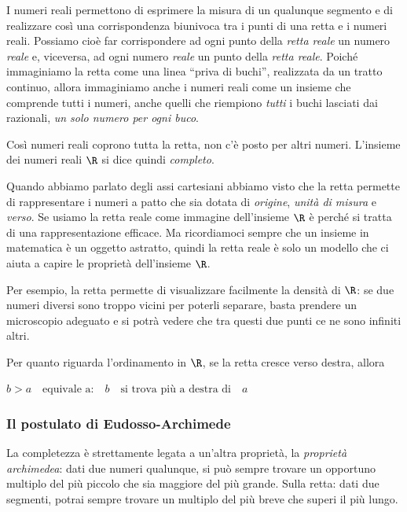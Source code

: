 
I numeri reali 
permettono di esprimere la misura di un qualunque segmento e di realizzare così 
una corrispondenza biunivoca tra i punti di una retta e i numeri reali. 
Possiamo cioè far corrispondere ad ogni punto della \emph{retta reale} un 
numero \emph{reale} e, viceversa, ad ogni numero \emph{reale} un punto della 
\emph{retta reale}. 
Poiché immaginiamo la retta come una linea ``priva di buchi'', realizzata da un 
tratto continuo,
allora immaginiamo anche i numeri reali come un insieme che comprende tutti i 
numeri, anche quelli che riempiono \emph{tutti} i buchi lasciati
dai razionali, \emph{un solo numero per ogni buco}. 

Così numeri reali coprono tutta la retta, non c'è posto per altri numeri.
L'insieme dei numeri reali \(\R\) si dice quindi \emph{completo}.

Quando abbiamo parlato degli assi cartesiani abbiamo visto che la retta 
permette di rappresentare i numeri a patto che sia dotata di \emph{origine}, 
\emph{unità di misura} e \emph{verso}.
Se usiamo la retta reale come immagine dell'insieme \(\R\) è perché si tratta di 
una rappresentazione efficace. Ma ricordiamoci sempre che un insieme in 
matematica è un oggetto astratto, quindi la retta reale è solo un modello che ci 
aiuta a capire le proprietà dell'insieme \(\R\).

Per esempio, la retta permette di visualizzare facilmente la densità di \(\R\): 
se due numeri diversi sono troppo vicini per poterli separare, basta prendere un 
microscopio adeguato e si potrà vedere che tra questi due punti ce ne sono 
infiniti altri.

Per quanto riguarda l'ordinamento in \(\R\), se la retta cresce verso destra, 
allora 
\begin{center} 
\(b > a \quad \text{equivale a:} \quad 
b \quad \text{si trova più a destra di}\quad a\) 
\end{center}


\subsubsection{Il postulato di Eudosso-Archimede}

La completezza è strettamente legata a un'altra proprietà, la 
\emph{proprietà archimedea}: 
dati due numeri qualunque, si può sempre trovare un opportuno 
multiplo del più piccolo che sia maggiore del più grande. 
Sulla retta: dati due segmenti, potrai sempre trovare un multiplo del più breve 
che superi il più lungo.

